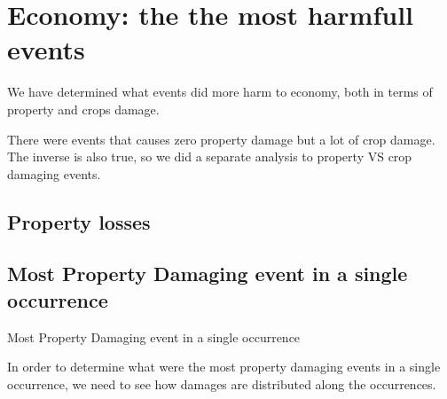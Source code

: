 \documentclass[]{article}
\begin{document}
\section{Economy: the the most harmfull
events}\label{economy-the-the-most-harmfull-events}

We have determined what events did more harm to economy, both in terms
of property and crops damage.

There were events that causes zero property damage but a lot of crop
damage. The inverse is also true, so we did a separate analysis to
property VS crop damaging events.

\subsection{Property losses}\label{property-losses}

\subsection{Most Property Damaging event in a single
occurrence}\label{most-property-damaging-event-in-a-single-occurrence}

Most Property Damaging event in a single occurrence

In order to determine what were the most property damaging events in a
single occurrence, we need to see how damages are distributed along the
occurrences.
\end{document}
